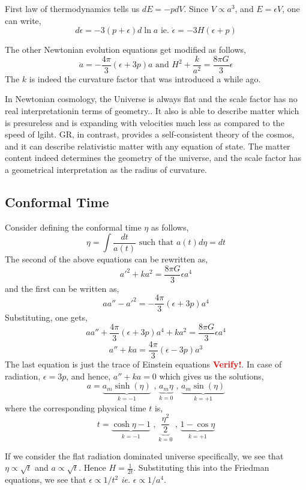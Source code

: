 \documentclass[a4paper,11pt]{article}
\begin{document}
First law of thermodynamics tells us $dE = -pdV$. Since $V \propto a^3$, and $E = \epsilon V$, one can write,
$$d \epsilon = -3 (p+\epsilon) d\ln a \text{ ie. } \dot{\epsilon} = -3H(\epsilon + p)$$

The other Newtonian evolution equations get modified as follows, 
$$\ddot{a} = -\frac{4 \pi}{3}(\epsilon + 3p)a \text{ and } H^2 + \frac{k}{a^2} = \frac{8 \pi G}{3}\epsilon$$ 
The $k$ is indeed the curvature factor that was introduced a while ago.

In Newtonian cosmology, the Universe is always flat and the scale factor has no real interpretationin terms of geometry.. It also is able to describe matter which is presureless and is expanding with velocities much less as compared to the speed of lgiht. GR, in contrast, provides a self-consistent theory of the cosmos, and it can describe relativistic matter with any equation of state. The matter content indeed determines the geometry of the universe, and the scale factor has a geometrical interpretation as the radius of curvature.

\subsection{Conformal Time}
Consider defining the conformal time $\eta$ as follows,
$$\eta = \int \frac{dt}{a(t)} \text{ such that } a(t)d\eta = dt$$
The second of the above equations can be rewritten as,
$$ a'^2 + k a^2 = \frac{8\pi G}{3}\epsilon a^4$$  and the first can be written as,
$$a a'' -a'^2 = -\frac{4 \pi}{3}(\epsilon + 3p)a^4$$
Substituting, one gets,
$$a a'' + \frac{4 \pi}{3}(\epsilon + 3p)a^4 + k a^2 = \frac{8\pi G}{3}\epsilon a^4$$
$$a'' + k a = \frac{4 \pi}{3}(\epsilon - 3p)a^3 $$
The last equation is just the trace of Einstein equations \textbf{\textcolor{red}{Verify!}}. In case of radiation, $\epsilon = 3p$, and hence, $a'' + ka = 0$ which gives us the solutions,
$$a = \underbrace{a_m \sinh(\eta)}_{k=-1} \text{ , }\underbrace{a_m \eta}_{k=0} \text{ , } \underbrace{a_m \sin(\eta)}_{k=+1} $$ where the corresponding physical time $t$ is,
$$t = \underbrace{\cosh \eta - 1}_{k=-1} \text{ , }\underbrace{\frac{\eta^2}{2}}_{k=0} \text{ , } \underbrace{1 - \cos \eta}_{k=+1} $$

If we consider the flat radiation dominated universe specifically, we see that $\eta \propto \sqrt{t}$ and $a \propto \sqrt{t}$. Hence $H = \frac{1}{2t}$. Substituting this into the Friedman equations, we see that $\epsilon \propto 1/t^2$ \textit{ie.} $\epsilon \propto 1/a^4$.
\end{document}
